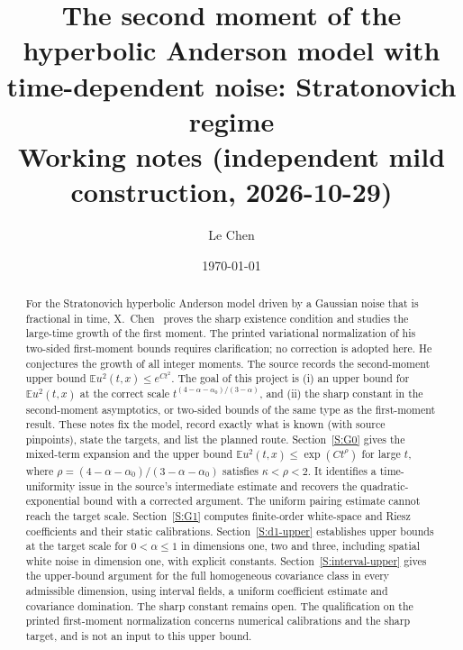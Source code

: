 \documentclass[12pt]{article}
\numberwithin{equation}{section}
\theoremstyle{definition}
\newcommand{\E}{\mathbb{E}}
\begin{document}
\title{The second moment of the hyperbolic Anderson model with time-dependent
noise: Stratonovich regime\\[0.3em]
{\normalsize Working notes (independent mild construction, 2026-10-29)}}
\author{Le Chen}
\date{\today}
\maketitle

\begin{abstract}
  For the Stratonovich hyperbolic Anderson model driven by a Gaussian noise
  that is fractional in time, X.~Chen~\cite{chen:author2026:time-dependency}
  proves the sharp existence condition and studies the large-time growth
  of the first moment. The printed variational normalization of his
  two-sided first-moment bounds requires clarification; no correction is
  adopted here. He conjectures the growth of all integer moments. The source records the second-moment upper bound
  $\E u^2(t,x)\le e^{Ct^2}$. The goal of this project is (i) an upper bound
  for $\E u^2(t,x)$ at the correct scale
  $t^{(4-\alpha-\alpha_0)/(3-\alpha)}$, and (ii) the sharp constant in the
  second-moment asymptotics, or two-sided bounds of the same type as the
  first-moment result. These notes fix the model, record exactly what is
  known (with source pinpoints), state the targets, and list the planned
  route. Section~\ref{S:G0} gives the mixed-term expansion and the upper
  bound $\E u^2(t,x)\le\exp(Ct^\rho)$ for large $t$, where
  $\rho=(4-\alpha-\alpha_0)/(3-\alpha-\alpha_0)$ satisfies
  $\kappa<\rho<2$. It identifies a time-uniformity issue in the source's
  intermediate estimate and recovers the quadratic-exponential bound
  with a corrected argument. The uniform pairing estimate cannot reach
  the target scale. Section~\ref{S:G1} computes finite-order white-space
  and Riesz coefficients and their static calibrations.
  Section~\ref{S:d1-upper} establishes upper bounds at the target
  scale for $0<\alpha\le1$ in dimensions one, two and three, including
  spatial white noise in dimension one, with explicit constants.
  Section~\ref{S:interval-upper} gives the upper-bound argument for the
  full homogeneous covariance class in every admissible dimension,
  using interval fields, a uniform coefficient estimate and covariance
  domination. The sharp constant remains open. The qualification on the
  printed first-moment normalization concerns numerical calibrations and
  the sharp target, and is not an input to this upper bound.
\end{abstract}
\end{document}
